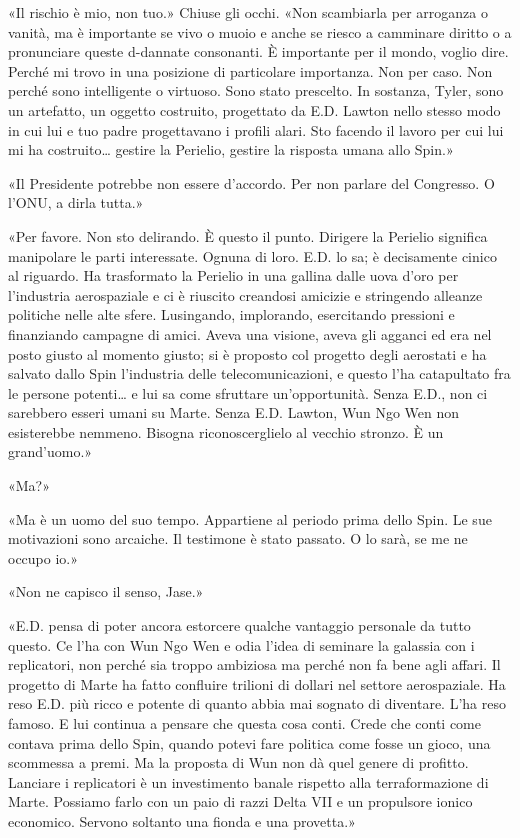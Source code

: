 «Il rischio è mio, non tuo.» Chiuse gli occhi. «Non scambiarla per
arroganza o vanità, ma è importante se vivo o muoio e anche se riesco a
camminare diritto o a pronunciare queste d-dannate consonanti. È
importante per il mondo, voglio dire. Perché mi trovo in una posizione
di particolare importanza. Non per caso. Non perché sono intelligente o
virtuoso. Sono stato prescelto. In sostanza, Tyler, sono un artefatto,
un oggetto costruito, progettato da E.D. Lawton nello stesso modo in cui
lui e tuo padre progettavano i profili alari. Sto facendo il lavoro per
cui lui mi ha costruito\ldots{} gestire la Perielio, gestire la risposta
umana allo Spin.»

«Il Presidente potrebbe non essere d'accordo. Per non parlare del
Congresso. O l'ONU, a dirla tutta.»

«Per favore. Non sto delirando. È questo il punto. Dirigere la Perielio
significa manipolare le parti interessate. Ognuna di loro. E.D. lo sa; è
decisamente cinico al riguardo. Ha trasformato la Perielio in una
gallina dalle uova d'oro per l'industria aerospaziale e ci è riuscito
creandosi amicizie e stringendo alleanze politiche nelle alte sfere.
Lusingando, implorando, esercitando pressioni e finanziando campagne di
amici. Aveva una visione, aveva gli agganci ed era nel posto giusto al
momento giusto; si è proposto col progetto degli aerostati e ha salvato
dallo Spin l'industria delle telecomunicazioni, e questo l'ha
catapultato fra le persone potenti\ldots{} e lui sa come sfruttare
un'opportunità. Senza E.D., non ci sarebbero esseri umani su Marte.
Senza E.D. Lawton, Wun Ngo Wen non esisterebbe nemmeno. Bisogna
riconoscerglielo al vecchio stronzo. È un grand'uomo.»

«Ma?»

«Ma è un uomo del suo tempo. Appartiene al periodo prima dello Spin. Le
sue motivazioni sono arcaiche. Il testimone è stato passato. O lo sarà,
se me ne occupo io.»

«Non ne capisco il senso, Jase.»

«E.D. pensa di poter ancora estorcere qualche vantaggio personale da
tutto questo. Ce l'ha con Wun Ngo Wen e odia l'idea di seminare la
galassia con i replicatori, non perché sia troppo ambiziosa ma perché
non fa bene agli affari. Il progetto di Marte ha fatto confluire
trilioni di dollari nel settore aerospaziale. Ha reso E.D. più ricco e
potente di quanto abbia mai sognato di diventare. L'ha reso famoso. E
lui continua a pensare che questa cosa conti. Crede che conti come
contava prima dello Spin, quando potevi fare politica come fosse un
gioco, una scommessa a premi. Ma la proposta di Wun non dà quel genere
di profitto. Lanciare i replicatori è un investimento banale rispetto
alla terraformazione di Marte. Possiamo farlo con un paio di razzi Delta
VII e un propulsore ionico economico. Servono soltanto una fionda e una
provetta.»

